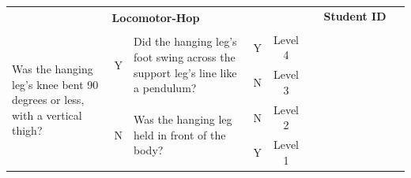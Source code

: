 \documentclass[
  letterpaper,
  DIV=11,
  numbers=noendperiod]{scrartcl}
\author{}
\date{}
\begin{document}
\setlength{\tabcolsep}{3pt}
\renewcommand{\arraystretch}{1.6}
\small
\vspace*{.5em} %

\begin{tabular}{|p{5.5cm}|c|p{5.5cm}|c|c|*{9}{p{1.07cm}|}}
\hline
\multicolumn{5}{|c|}{\multirow{2}{*}{\centering \textbf{Locomotor-Hop}}} & \multicolumn{9}{c|}{\textbf{Student ID}} \\ 
\cline{6-14}
\multicolumn{5}{|c|}{} & & & & & & & & & \\
\hline
\multirow{4}{5.5cm}{\raggedright {\footnotesize Was the hanging leg's knee bent 90 degrees or less, with a vertical thigh?}} 
& \multirow{2}{*}{\footnotesize Y} 
& \multirow{2}{5cm}{\raggedright {\footnotesize Did the hanging leg's foot swing across the support leg's line like a pendulum?}} & {\footnotesize Y} & {\footnotesize Level 4} & & & & & & & & & \\
\cline{4-14}
& & & {\footnotesize N} & {\footnotesize Level 3} & & & & & & & & & \\
\cline{2-14}
& \multirow{2}{*}{\footnotesize N} & \multirow{2}{5cm}{\raggedright {\footnotesize Was the hanging leg held in front of the body?}} & {\footnotesize N} & {\footnotesize Level 2} & & & & & & & & & \\
\cline{4-14}
& & & {\footnotesize Y} & {\footnotesize Level 1} & & & & & & & & & \\
\hline
\end{tabular}

\vspace{.5em}
\end{document}
